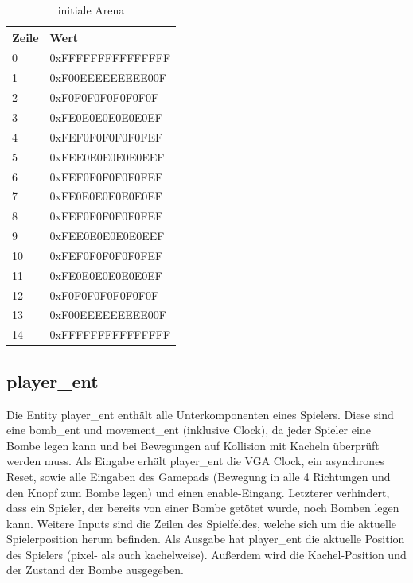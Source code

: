 \documentclass[parskip=full]{scrartcl}
\begin{document}
				\begin{table}[H]
					\centering
					\label{initialMap}
					\begin{tabular}{|l|l|}
						\hline
						\textbf{Zeile} & \textbf{Wert}      \\ \hline
						0           &      0xFFFFFFFFFFFFFFF          \\ 
						1          &          0xF00EEEEEEEEE00F        \\ 
						2           &           0xF0F0F0F0F0F0F0F           \\ 
						3           &      0xFE0E0E0E0E0E0EF   \\ 
						4           &    0xFEF0F0F0F0F0FEF  \\ 
						5           &     0xFEE0E0E0E0E0EEF \\ 
						6           &     0xFEF0F0F0F0F0FEF \\ 
						7           &    0xFE0E0E0E0E0E0EF  \\ 
						8           &   0xFEF0F0F0F0F0FEF   \\ 
						9           &     0xFEE0E0E0E0E0EEF \\ 
						10           &    0xFEF0F0F0F0F0FEF  \\ 
						11           &   0xFE0E0E0E0E0E0EF   \\ 
						12           &    0xF0F0F0F0F0F0F0F  \\ 
						13           &    0xF00EEEEEEEEE00F  \\ 
						14           &    0xFFFFFFFFFFFFFFF  \\ \hline
					\end{tabular}
					\caption{initiale Arena}
				\end{table}			

			\subsection{player\_ent}
				Die Entity player\_ent enthält alle Unterkomponenten eines Spielers. 
				Diese sind eine bomb\_ent und movement\_ent (inklusive Clock), da jeder Spieler eine Bombe legen kann und bei Bewegungen auf Kollision mit Kacheln überprüft werden muss.
				Als Eingabe erhält player\_ent die VGA Clock, ein asynchrones Reset, sowie alle Eingaben des Gamepads (Bewegung in alle 4 Richtungen und den Knopf zum Bombe legen) und einen enable-Eingang. Letzterer verhindert, dass ein Spieler, der bereits von einer Bombe getötet wurde, noch Bomben legen kann. Weitere Inputs sind die Zeilen des Spielfeldes, welche sich um die aktuelle Spielerposition herum befinden.
				Als Ausgabe hat player\_ent die aktuelle Position des Spielers (pixel- als auch kachelweise). Außerdem wird die Kachel-Position und der Zustand der Bombe ausgegeben.
				
\end{document}
